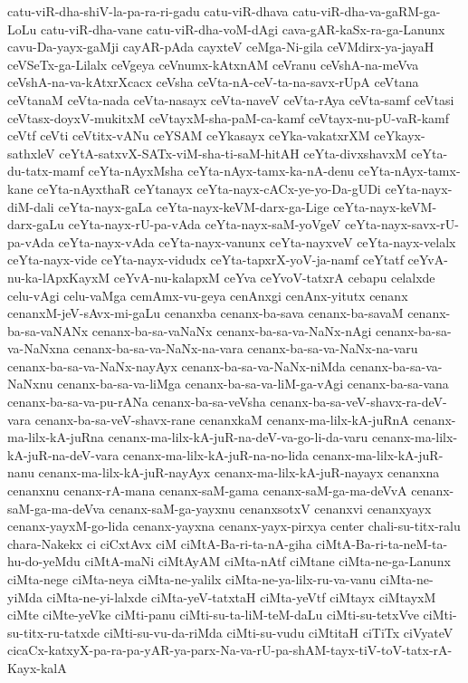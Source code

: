 {catu-viR-dha-shiV-la-pa-ra-ri-gadu
catu-viR-dhava
catu-viR-dha-va-gaRM-ga-LoLu
catu-viR-dha-vane
catu-viR-dha-voM-dAgi
cava-gAR-kaSx-ra-ga-Lanunx
cavu-Da-yayx-gaMji
cayAR-pAda
cayxteV
ceMga-Ni-gila
ceVMdirx-ya-jayaH
ceVSeTx-ga-Lilalx
ceVgeya
ceVnumx-kAtxnAM
ceVranu
ceVshA-na-meVva
ceVshA-na-va-kAtxrXcacx
ceVsha
ceVta-nA-ceV-ta-na-savx-rUpA
ceVtana
ceVtanaM
ceVta-nada
ceVta-nasayx
ceVta-naveV
ceVta-rAya
ceVta-samf
ceVtasi
ceVtasx-doyxV-mukitxM
ceVtayxM-sha-paM-ca-kamf
ceVtayx-nu-pU-vaR-kamf
ceVtf
ceVti
ceVtitx-vANu
ceYSAM
ceYkasayx
ceYka-vakatxrXM
ceYkayx-sathxleV
ceYtA-satxvX-SATx-viM-sha-ti-saM-hitAH
ceYta-divxshavxM
ceYta-du-tatx-mamf
ceYta-nAyxMsha
ceYta-nAyx-tamx-ka-nA-denu
ceYta-nAyx-tamx-kane
ceYta-nAyxthaR
ceYtanayx
ceYta-nayx-cACx-ye-yo-Da-gUDi
ceYta-nayx-diM-dali
ceYta-nayx-gaLa
ceYta-nayx-keVM-darx-ga-Lige
ceYta-nayx-keVM-darx-gaLu
ceYta-nayx-rU-pa-vAda
ceYta-nayx-saM-yoVgeV
ceYta-nayx-savx-rU-pa-vAda
ceYta-nayx-vAda
ceYta-nayx-vanunx
ceYta-nayxveV
ceYta-nayx-velalx
ceYta-nayx-vide
ceYta-nayx-vidudx
ceYta-tapxrX-yoV-ja-namf
ceYtatf
ceYvA-nu-ka-lApxKayxM
ceYvA-nu-kalapxM
ceYva
ceYvoV-tatxrA
cebapu
celalxde
celu-vAgi
celu-vaMga
cemAmx-vu-geya
cenAnxgi
cenAnx-yitutx
cenanx
cenanxM-jeV-sAvx-mi-gaLu
cenanxba
cenanx-ba-sava
cenanx-ba-savaM
cenanx-ba-sa-vaNANx
cenanx-ba-sa-vaNaNx
cenanx-ba-sa-va-NaNx-nAgi
cenanx-ba-sa-va-NaNxna
cenanx-ba-sa-va-NaNx-na-vara
cenanx-ba-sa-va-NaNx-na-varu
cenanx-ba-sa-va-NaNx-nayAyx
cenanx-ba-sa-va-NaNx-niMda
cenanx-ba-sa-va-NaNxnu
cenanx-ba-sa-va-liMga
cenanx-ba-sa-va-liM-ga-vAgi
cenanx-ba-sa-vana
cenanx-ba-sa-va-pu-rANa
cenanx-ba-sa-veVsha
cenanx-ba-sa-veV-shavx-ra-deV-vara
cenanx-ba-sa-veV-shavx-rane
cenanxkaM
cenanx-ma-lilx-kA-juRnA
cenanx-ma-lilx-kA-juRna
cenanx-ma-lilx-kA-juR-na-deV-va-go-li-da-varu
cenanx-ma-lilx-kA-juR-na-deV-vara
cenanx-ma-lilx-kA-juR-na-no-lida
cenanx-ma-lilx-kA-juR-nanu
cenanx-ma-lilx-kA-juR-nayAyx
cenanx-ma-lilx-kA-juR-nayayx
cenanxna
cenanxnu
cenanx-rA-mana
cenanx-saM-gama
cenanx-saM-ga-ma-deVvA
cenanx-saM-ga-ma-deVva
cenanx-saM-ga-yayxnu
cenanxsotxV
cenanxvi
cenanxyayx
cenanx-yayxM-go-lida
cenanx-yayxna
cenanx-yayx-pirxya
center
chali-su-titx-ralu
chara-Nakekx
ci
ciCxtAvx
ciM
ciMtA-Ba-ri-ta-nA-giha
ciMtA-Ba-ri-ta-neM-ta-hu-do-yeMdu
ciMtA-maNi
ciMtAyAM
ciMta-nAtf
ciMtane
ciMta-ne-ga-Lanunx
ciMta-nege
ciMta-neya
ciMta-ne-yalilx
ciMta-ne-ya-lilx-ru-va-vanu
ciMta-ne-yiMda
ciMta-ne-yi-lalxde
ciMta-yeV-tatxtaH
ciMta-yeVtf
ciMtayx
ciMtayxM
ciMte
ciMte-yeVke
ciMti-panu
ciMti-su-ta-liM-teM-daLu
ciMti-su-tetxVve
ciMti-su-titx-ru-tatxde
ciMti-su-vu-da-riMda
ciMti-su-vudu
ciMtitaH
ciTiTx
ciVyateV
cicaCx-katxyX-pa-ra-pa-yAR-ya-parx-Na-va-rU-pa-shAM-tayx-tiV-toV-tatx-rA-Kayx-kalA
}
